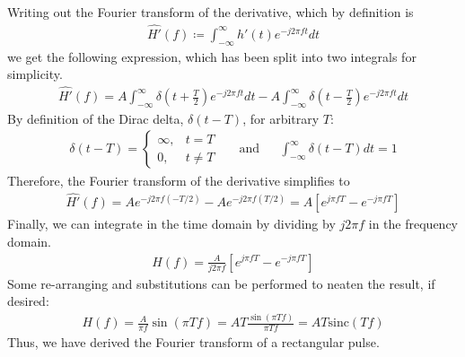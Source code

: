 \documentclass[a4paper, 11pt]{article}
\begin{document}
Writing out the Fourier transform of the derivative, which by definition is
\begin{align*}
    \widehat{H'}(f) \coloneqq \int_{-\infty}^{\infty} h'(t) e^{-j2\pi ft} dt
\end{align*}
we get the following expression, which has been split into two integrals for
simplicity.
\begin{align*}
    \widehat{H'}(f) = A \int_{-\infty}^{\infty} \delta(t + \frac{T}{2}) e^{-j2\pi ft} dt -
            A \int_{-\infty}^{\infty} \delta(t - \frac{T}{2}) e^{-j2\pi ft} dt
\end{align*}
By definition of the Dirac delta, $\delta(t-T)$, for arbitrary $T$:
\begin{align*}
    \delta(t-T) = \begin{cases}
        \infty, & t = T \\
        0,      & t \neq T
    \end{cases}
    && \text{and} &&
    \int_{-\infty}^{\infty} \delta(t-T) dt = 1
\end{align*}
Therefore, the Fourier transform of the derivative simplifies to
\begin{align*}
    \widehat{H'}(f) = Ae^{-j2\pi f(-T/2)} - Ae^{-j2\pi f(T/2)}
          = A \left[ e^{j\pi fT} - e^{-j\pi fT}\right]
\end{align*}
Finally, we can integrate in the time domain by dividing by $j2\pi f$ in the
frequency domain.
\begin{align*}
    H(f) = \frac{A}{j2\pi f} \left[ e^{j\pi fT} - e^{-j\pi fT}\right]
\end{align*}
Some re-arranging and substitutions can be performed to neaten the result, if desired:
\begin{align*}
    H(f) = \frac{A}{\pi f}\sin(\pi Tf)
         = AT\frac{\sin(\pi Tf)}{\pi Tf}
         = AT\text{sinc}(Tf)
\end{align*}
Thus, we have derived the Fourier transform of a rectangular pulse.
\end{document}

